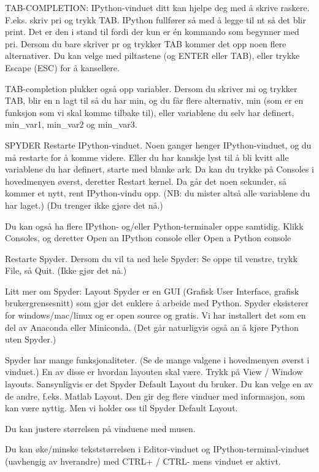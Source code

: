 TAB-COMPLETION: 
IPython-vinduet ditt kan hjelpe deg med å skrive raskere.
F.eks. skriv pri og trykk TAB. IPython fullfører så med å legge til nt så det blir print.
Det er den i stand til fordi der kun er én kommando som begynner med pri.
Dersom du bare skriver pr og trykker TAB kommer det opp noen flere alternativer.
Du kan velge med piltastene (og ENTER eller TAB), eller trykke Escape (ESC) for å kansellere.

TAB-completion plukker også opp variabler.
Dersom du skriver mi og trykker TAB, blir en n lagt til så du har min,
og du får flere alternativ, min (som er en funksjon som vi skal komme tilbake til),
eller variablene du selv har definert, min_var1, min_var2 og min_var3.






SPYDER
Restarte IPython-vinduet.
Noen ganger henger IPython-vinduet, og du må restarte for å komme videre.
Eller du har kanskje lyst til å bli kvitt alle variablene du har definert,
starte med blanke ark. 
Da kan du trykke på Consoles i hovedmenyen øverst, deretter Restart kernel. 
Da går det noen sekunder, så kommer et nytt, rent IPython-vindu opp.
(NB: du mister altså alle variablene du har laget.) 
(Du trenger ikke gjøre det nå.)

Du kan også ha flere IPython- og/eller Python-terminaler oppe samtidig.
Klikk Consoles, og deretter 
Open an IPython console
eller 
Open a Python console


Restarte Spyder.
Dersom du vil ta ned hele Spyder: Se oppe til venstre, trykk File, så Quit. 
(Ikke gjør det nå.) 


Litt mer om Spyder: Layout 
Spyder er en GUI (Grafisk User Interface, grafisk brukergrensesnitt)
som gjør det enklere å arbeide med Python.
Spyder eksisterer for windows/mac/linux og er open source og gratis. 
Vi har installert det som en del av Anaconda eller Miniconda. 
(Det går naturligvis også an å kjøre Python uten Spyder.)


Spyder har mange funksjonaliteter.
(Se de mange valgene i hovedmenyen øverst i vinduet.)
En av disse er hvordan layouten skal være. 
Trykk på View / Window layouts.
Sansynligvis er det Spyder Default Layout du bruker.
Du kan velge en av de andre, f.eks. Matlab Layout.
Den gir deg flere vinduer med informasjon, som kan være nyttig.
Men vi holder oss til Spyder Default Layout.

Du kan justere størrelsen på vinduene med musen. 

Du kan øke/minske tekststørrelsen i Editor-vinduet og IPython-terminal-vinduet
(uavhengig av hverandre) med CTRL+ / CTRL- mens vinduet er aktivt. 

